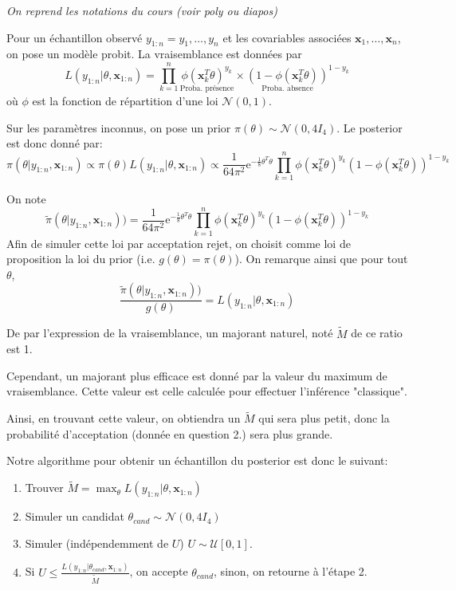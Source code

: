\documentclass[]{article}
\newenvironment{Correction}%
  { \vspace{\baselineskip}\begin{mdframed}[backgroundcolor=my_green]}%
  {\end{mdframed}}
\begin{document}
\begin{Correction}
\textit{On reprend les notations du cours (voir poly ou diapos)}

Pour un échantillon observé $y_{1:n} = y_1,\dots, y_n$ et les covariables associées $\mathbf{x}_1,\dots,\mathbf{x}_n$, on pose un modèle probit. 
La vraisemblance est données par
$$L(y_{1:n}\vert \theta,\mathbf{x}_{1:n}) = \prod_{k = 1}^n \underset{\text{Proba. présence}}{\phi(\mathbf{x}_k^T\theta)^{y_k}}\times \underset{\text{Proba. absence}}{(1 - \phi(\mathbf{x}_k^T\theta))}^{1 - y_k}$$
où $\phi$ est la fonction de répartition d'une loi $\mathcal{N}(0, 1)$.

Sur les paramètres inconnus, on pose un prior $\pi(\theta)\sim \mathcal{N}(0, 4 I_4)$.
Le posterior est donc donné par:
$$\pi(\theta \vert y_{1:n}, \mathbf{x}_{1:n}) \propto \pi(\theta) L(y_{1:n}\vert \theta, \mathbf{x}_{1:n}) \propto \frac{1}{64\pi^2}\text{e}^{-\frac{1}{8}\theta^T\theta} \prod_{k = 1}^n \phi(\mathbf{x}_k^T\theta)^{y_k} (1 - \phi(\mathbf{x}_k^T\theta))^{1 - y_k}$$

On note 
$$\tilde{\pi}(\theta \vert y_{1:n}, \mathbf{x}_{1:n})) = \frac{1}{64\pi^2}\text{e}^{-\frac{1}{8}\theta^T\theta} \prod_{k = 1}^n \phi(\mathbf{x}_k^T\theta)^{y_k} (1 - \phi(\mathbf{x}_k^T\theta))^{1 - y_k}$$
Afin de simuler cette loi par acceptation rejet, on choisit comme loi de proposition la loi du prior (i.e. $g(\theta) = \pi(\theta)$).
On remarque ainsi que pour tout $\theta$,
$$\frac{\tilde{\pi}(\theta \vert y_{1:n}, \mathbf{x}_{1:n}))}{g(\theta)} =  L(y_{1:n}\vert \theta, \mathbf{x}_{1:n})$$

De par l'expression de la vraisemblance, un majorant naturel, noté $\tilde{M}$ de ce ratio est 1.

Cependant, un majorant plus efficace est donné par la valeur du maximum de vraisemblance. Cette valeur est celle calculée pour effectuer l'inférence "classique".

Ainsi, en trouvant cette valeur, on obtiendra un $\tilde{M}$ qui sera plus petit, donc la probabilité d'acceptation (donnée en question 2.) sera plus grande.

Notre algorithme pour obtenir un échantillon du posterior est donc le suivant:

\begin{enumerate}
\item Trouver $\tilde{M} = \max_\theta L(y_{1:n}\vert \theta, \mathbf{x}_{1:n})$
\item Simuler un candidat $\theta_{cand} \sim \mathcal{N}(0, 4 I_4)$
\item Simuler (indépendemment de $U$) $U\sim\mathcal{U}[0,1]$.
\item Si $U \leq  \frac{L(y_{1:n}\vert \theta_{cand}, \mathbf{x}_{1:n})}{\tilde{M}}$, on accepte $\theta_{cand}$, sinon, on retourne à l'étape 2.
\end{enumerate}
\end{Correction}
\end{document}
